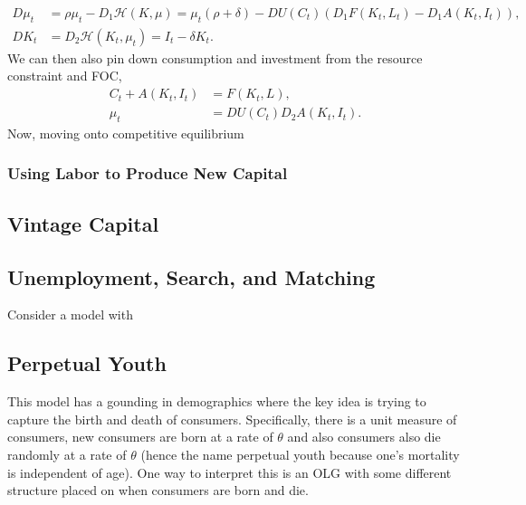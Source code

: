 \documentclass[11pt,english]{article}
\begin{document}
\begin{align*}
D\mu_t &= \rho \mu_t - D_1\mathcal{H}(K, \mu) = \mu_t(\rho + \delta) - DU(C_t)(D_1F(K_t, L_t) - D_1A(K_t, I_t)),\\
DK_t &= D_2\mathcal{H}(K_t, \mu_t) = I_t - \delta K_t.
\end{align*} We can then also pin down consumption and investment from the resource constraint and FOC,
\begin{align*}
C_t + A(K_t, I_t) &= F(K_t, L),\\
\mu_t &= DU(C_t)D_2A(K_t, I_t).
\end{align*} Now, moving onto competitive equilibrium

\subsubsection{Using Labor to Produce New Capital}

\subsection{Vintage Capital}


\subsection{Unemployment, Search, and Matching}
Consider a model with 

\subsection{Perpetual Youth}
This model has a gounding in demographics where the key idea is trying to capture the birth and death of consumers. Specifically, there is a unit measure of consumers, new consumers are born at a rate of $\theta$ and also consumers also die randomly at a rate of $\theta$ (hence the name perpetual youth because one's mortality is independent of age). One way to interpret this is an OLG with some different structure placed on when consumers are born and die.
\end{document}
